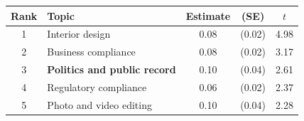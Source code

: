 \begin{tabular}{clccc}
\toprule \toprule
Rank & Topic & Estimate & (SE) & $t$ \\
\midrule
1 & Interior design & 0.08 & (0.02) & 4.98 \\
2 & Business compliance & 0.08 & (0.02) & 3.17 \\
3 & \textbf{Politics and public record} & 0.10 & (0.04) & 2.61 \\
4 & Regulatory compliance & 0.06 & (0.02) & 2.37 \\
5 & Photo and video editing & 0.10 & (0.04) & 2.28 \\
\bottomrule \bottomrule
\end{tabular}
